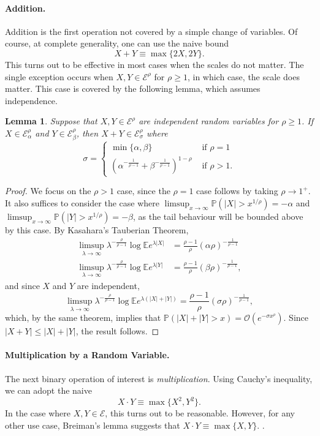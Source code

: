 \documentclass{article}
\newtheorem{lemma}[theorem]{Lemma}
\theoremstyle{definition}
\begin{document}
\paragraph{Addition.}
Addition is the first operation not covered by a simple change of variables. Of course, at complete generality, one can use the naive bound
\[
X + Y \equiv \max\{2 X, 2 Y\}.
\]
This turns out to be effective in most cases when the scales do not matter. The single exception occurs when $X,Y \in \mathcal{E}^\rho$ for $\rho \geq 1 $, in which case, the scale does matter. This case is covered by the following lemma, which assumes independence.
\begin{lemma}
\label{lem:sum}
Suppose that $X, Y \in \mathcal{E}^\rho$ are independent random variables for $\rho \geq 1$. If $X \in \mathcal{E}_\alpha^\rho$ and $Y \in \mathcal{E}_\beta^\rho$, then $X + Y \in \mathcal{E}_\sigma^\rho$ where
\[
\sigma = \begin{cases}
\min\{\alpha,\beta\}&\mbox{ if } \rho = 1 \\
(\alpha^{-\frac{1}{\rho-1}}+\beta^{-\frac{1}{\rho-1}})^{1-\rho} &\mbox{ if } \rho > 1.
\end{cases}
\]
\end{lemma}
\begin{proof}
We focus on the $\rho > 1$ case, since the $\rho = 1$ case follows by taking $\rho \to 1^+$. It also suffices to consider the case where $\limsup_{x \to \infty} \mathbb{P}(|X| > x^{1/\rho}) = -\alpha$ and $\limsup_{x\to\infty} \mathbb{P}(|Y| > x^{1/\rho}) = -\beta$, as the tail behaviour will be bounded above by this case. By Kasahara's Tauberian Theorem, 
\begin{align*}
\limsup_{\lambda \to \infty} \lambda^{-\frac{\rho}{\rho-1}}\log \mathbb{E}e^{\lambda |X|} &= \frac{\rho - 1}{\rho} (\alpha \rho)^{-\frac{1}{\rho-1}} \\
\limsup_{\lambda \to \infty} \lambda^{-\frac{\rho}{\rho-1}}\log \mathbb{E}e^{\lambda |Y|} &= \frac{\rho - 1}{\rho} (\beta \rho)^{-\frac{1}{\rho-1}},
\end{align*}
and since $X$ and $Y$ are independent,
\[
\limsup_{\lambda \to \infty} \lambda^{-\frac{\rho}{\rho-1}}\log \mathbb{E}e^{\lambda (|X|+|Y|)} = \frac{\rho - 1}{\rho} (\sigma \rho)^{-\frac{1}{\rho-1}},
\]
which, by the same theorem, implies that $\mathbb{P}(|X|+|Y|>x) = \mathcal{O}(e^{-\sigma x^\rho})$.
Since $|X+Y| \leq |X| + |Y|$, the result follows.
\end{proof}

\paragraph{Multiplication by a Random Variable.}
The next binary operation of interest is \emph{multiplication}. Using Cauchy's inequality, we can adopt the naive
\[
X \cdot Y \equiv \max\{X^2, Y^2\}.
\]
In the case where $X,Y \in \mathcal{E}$, this turns out to be reasonable. However, for any other use case, Breiman's lemma suggests that $X \cdot Y \equiv \max\{X, Y\}$. .
\end{document}
